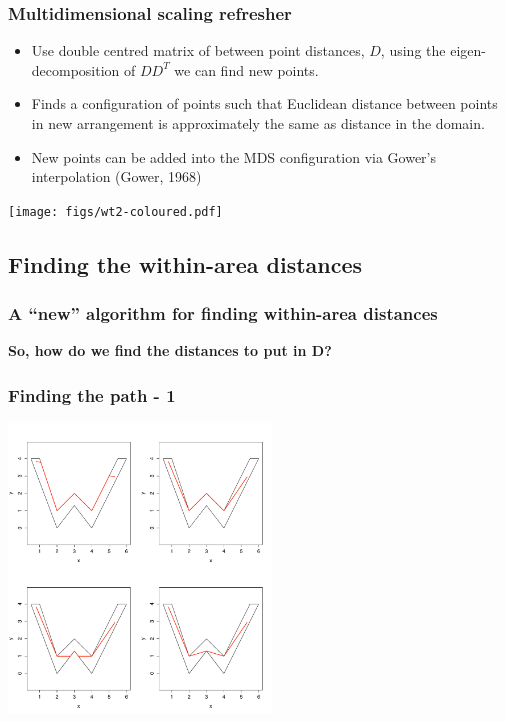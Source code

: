 \documentclass[ignorenonframetext]{beamer} %
\newcommand{\bc}{\begin{center}}
\newcommand{\ec}{\end{center}}
\newcommand{\bi}{\begin{itemize}}
\newcommand{\ei}{\end{itemize}}
\begin{document}
\begin{frame}
	\frametitle{Multidimensional scaling refresher}
       \bi
         \item Use double centred matrix of between point distances, $D$, using the eigen-decomposition of $DD^T$ we can find new points.
         \item Finds a configuration of points such that Euclidean distance between points in new arrangement is approximately the same as distance in the domain.
          \item New points can be added into the MDS configuration via Gower's interpolation (Gower, 1968)
        \ei
            \centering
              \texttt{[image: figs/wt2-coloured.pdf]}\\
        
\end{frame}

\subsection{Finding the within-area distances}

\begin{frame}
	\frametitle{A ``new'' algorithm for finding within-area distances}

	\bc \textbf{So, how do we find the distances to put in D?}\ec
\end{frame}

\begin{frame}
	\frametitle{Finding the path - 1}
            \centering
              \includegraphics[width=2.75in]{figs/wood-2}\\
\end{frame}
\end{document}
